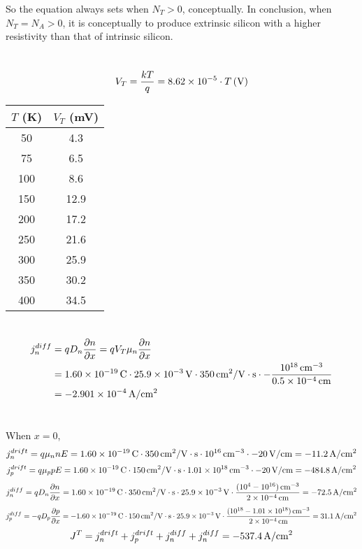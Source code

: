\documentclass{article}
\newcommand{\unit}[1]{{\rm\,#1}}
\begin{document}
So the equation always sets when $N_T>0$, conceptually. In conclusion, when $N_T=N_A>0$, it is conceptually to produce extrinsic silicon with a higher resistivity than that of intrinsic silicon.

\section{}
$$V_T=\frac{kT}{q}=8.62\times10^{-5}\cdot T\unit{(V)}$$
\begin{center}
\begin{tabular}{|c|c|}
\hline
$T$ (K) & $V_T$ (mV) \\\hline
50 & 4.3\\\hline
75 & 6.5\\\hline
100 & 8.6\\\hline
150 & 12.9\\\hline
200 & 17.2\\\hline
250 & 21.6\\\hline
300 & 25.9\\\hline
350 & 30.2\\\hline
400 & 34.5\\\hline
\end{tabular}
\end{center}

\section{}
\begin{align*}
j_n^{diff}&=qD_n\frac{\partial n}{\partial x}=qV_T\mu_n\frac{\partial n}{\partial x}\\
&=1.60\times10^{-19}\unit{C}\cdot25.9\times10^{-3}\unit{V}\cdot350\unit{cm^2/V\cdot s}\cdot-\frac{10^{18}\unit{cm^{-3}}}{0.5\times10^{-4}\unit{cm}}\\
&=-2.901\times10^{-4}\unit{A/cm^2}
\end{align*}


\section{}
When $x=0$,
$$j_n^{drift}=q\mu_nnE=1.60\times10^{-19}\unit{C}\cdot350\unit{cm^2/V\cdot s}\cdot10^{16}\unit{cm^{-3}}\cdot-20\unit{V/cm}=-11.2\unit{A/cm^2}$$
$$j_p^{drift}=q\mu_ppE=1.60\times10^{-19}\unit{C}\cdot150\unit{cm^2/V\cdot s}\cdot1.01\times10^{18}\unit{cm^{-3}}\cdot-20\unit{V/cm}=-484.8\unit{A/cm^2}$$
$$j_n^{diff}=qD_n\frac{\partial n}{\partial x}=1.60\times10^{-19}\unit{C}\cdot350\unit{cm^2/V\cdot s}\cdot25.9\times10^{-3}\unit{V}\cdot\frac{(10^4-10^{16})\unit{cm^{-3}}}{2\times10^{-4}\unit{cm}}=-72.5\unit{A/cm^2}$$
$$j_p^{diff}=-qD_p\frac{\partial p}{\partial x}=-1.60\times10^{-19}\unit{C}\cdot150\unit{cm^2/V\cdot s}\cdot25.9\times10^{-3}\unit{V}\cdot\frac{(10^{18}-1.01\times10^{18})\unit{cm^{-3}}}{2\times10^{-4}\unit{cm}}=31.1\unit{A/cm^2}$$
$$J^T=j_n^{drift}+j_p^{drift}+j_n^{diff}+j_n^{diff}=-537.4\unit{A/cm^2}$$
\end{document}
